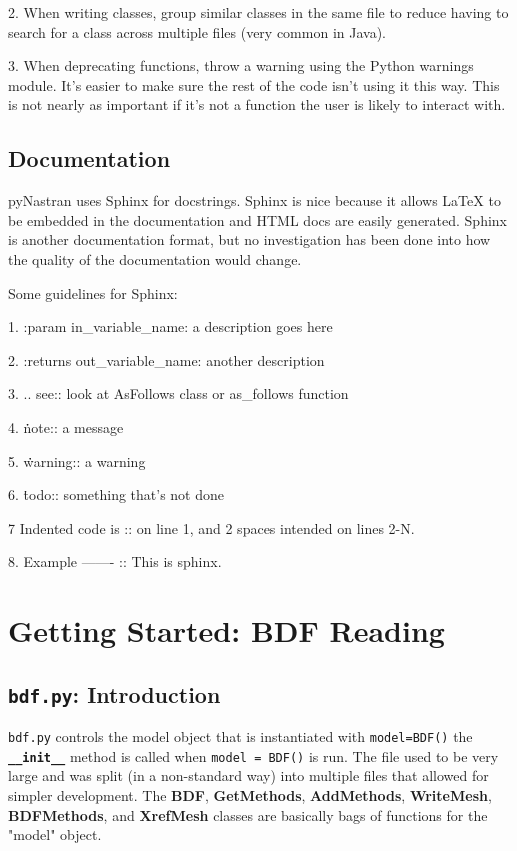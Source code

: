      2.  When writing classes, group similar classes in the same file to reduce having to search for a class across multiple files (very common in Java).

     3.  When deprecating functions, throw a warning using the Python warnings module.  It's easier to make sure the rest of the code isn't using it this way.  This is not nearly as important if it's not a function the user is likely to interact with.

 \subsection{Documentation}
     pyNastran uses Sphinx for docstrings.  Sphinx is nice because it allows LaTeX to be embedded in the documentation and HTML docs are easily generated.  Sphinx is another documentation format, but no investigation has been done into how the quality of the documentation would change.

    Some guidelines for Sphinx:

     1.  :param  in\_variable\_name: a description goes here

     2.  :returns out\_variable\_name: another description

     3.  .. see::    look at AsFollows class or as\_follows function

     4.  \.\. note::   a message

     5.  \.\. warning:: a warning

     6.  \.\. todo::   something that's not done
     
     7   Indented code is :: on line 1, and 2 spaces intended on lines 2-N.
     
     8.  Example
         -------
         ::
           This is sphinx.
     
     

\section{Getting Started: BDF Reading}
 \subsection{{\tt bdf.py}:  Introduction}
     {\tt bdf.py} controls the model object that is instantiated with      {\tt model=BDF()} the {\bf \tt \_\_init\_\_} method is called when {\tt model = BDF()} is run.  The file used to be very large and was split (in a non-standard way) into multiple files that allowed for simpler development.  The {\bf BDF}, {\bf GetMethods}, {\bf AddMethods}, {\bf WriteMesh}, {\bf BDFMethods}, and {\bf XrefMesh} classes are basically bags of functions for the "model" object.
     
